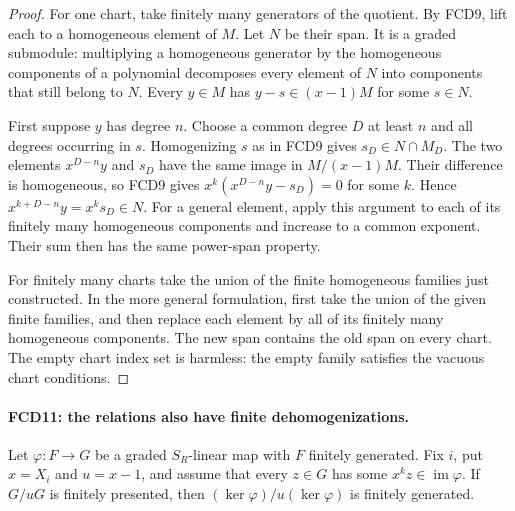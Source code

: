 \begin{proof}
For one chart, take finitely many generators of the quotient.
By FCD9, lift each to a homogeneous element of $M$.  Let $N$
be their span.  It is a graded submodule: multiplying a homogeneous
generator by the homogeneous components of a polynomial decomposes
every element of $N$ into components that still belong to $N$.
Every $y\in M$ has $y-s\in(x-1)M$ for some $s\in N$.

First suppose $y$ has degree $n$.  Choose a common degree $D$
at least $n$ and all degrees occurring in $s$.  Homogenizing $s$
as in FCD9 gives $s_D\in N\cap M_D$.  The two elements
$x^{D-n}y$ and $s_D$ have the same image in $M/(x-1)M$.
Their difference is homogeneous, so FCD9 gives
$x^k(x^{D-n}y-s_D)=0$ for some $k$.  Hence
$x^{k+D-n}y=x^ks_D\in N$.  For a general element, apply
this argument to each of its finitely many homogeneous components
and increase to a common exponent.  Their sum then has the same
power-span property.

For finitely many charts take the union of the finite homogeneous
families just constructed.  In the more general formulation, first
take the union of the given finite families, and then replace each
element by all of its finitely many homogeneous components.  The
new span contains the old span on every chart.  The empty chart
index set is harmless: the empty family satisfies the vacuous
chart conditions.
\end{proof}

\paragraph{FCD11: the relations also have finite dehomogenizations.}
\label{claim:FCD11}
Let $\varphi:F\to G$ be a graded $S_R$-linear map with $F$
finitely generated.  Fix $i$, put $x=X_i$ and $u=x-1$, and
assume that every $z\in G$ has some $x^kz\in\operatorname{im}\varphi$.
If $G/uG$ is finitely presented, then
$(\ker\varphi)/u(\ker\varphi)$ is finitely generated.

